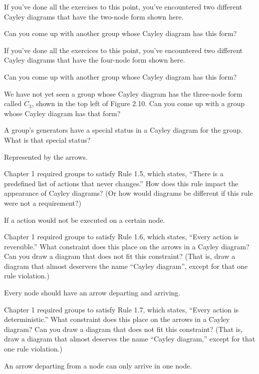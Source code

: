\documentclass[11pt]{exam}
\begin{document}
\begin{questions}
	\question If you've done all the exercises to this point, you've encountered two different Cayley diagrams that have the two-node form shown here.
	\par Can you come up with another group whose Cayley diagram has this form?
	
	\question If you've done all the exercices to this point, you've encountered two different Cayley diagrams that have the four-node form shown here.
	\par Can you come up with another group whose Cayley diagram has this form?
	
	\question We have not yet seen a group whose Cayley diagram has the three-node form called $C_3$, shown in the top left of Figure 2.10. Can you come up with a group whose Cayley diagram has that form?
	
	\question A group's generators have a special status in a Cayley diagram for the group. What is that special status?
	\begin{solution}
		Represented by the arrows.
	\end{solution}
	
	\question Chapter 1 required groups to satisfy Rule 1.5, which states, ``There is a predefined list of actions that never changes.'' How does this rule impact the appearance of Cayley diagrams? (Or how would diagrams be different if this rule were not a requirement?)
	\begin{solution}
		If a action would not be executed on a certain node.
	\end{solution}
	
	\question Chapter 1 required groups to satisfy Rule 1.6, which states, ``Every action is reversible.'' What constraint does this place on the arrows in a Cayley diagram? Can you draw a diagram that does not fit this constraint? (That is, draw a diagram that almost deservers the name ``Cayley diagram'', except for that one rule violation.)
	\begin{solution}
		Every node should have an arrow departing and arriving.
	\end{solution}

	\question Chapter 1 required groups to satisfy Rule 1.7, which states, ``Every action is deterministic.'' What constraint does this place on the arrows in a Cayley diagram? Can you draw a diagram that does not fit this constraint? (That is, draw a diagram that almost deserves the name ``Cayley diagram,'' except for that one rule violation.)
	\begin{solution}
		An arrow departing from a node can only arrive in one node.
	\end{solution}
	

\end{questions}
\end{document}
